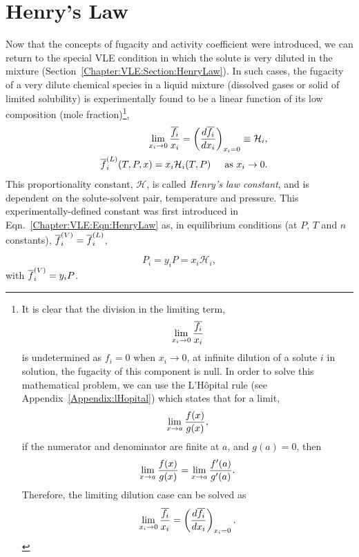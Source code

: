 \section{Henry's Law}\label{Chapter:SolutionThermodynamics:Section:HenryLaw}
Now that the concepts of fugacity and activity coefficient were introduced, we can return to the special VLE condition in which the solute is very diluted in the mixture (Section~\ref{Chapter:VLE:Section:HenryLaw}). In such cases, the fugacity of a very dilute chemical species in a liquid mixture (\eg dissolved gases or solid of limited solubility) is experimentally found to be a linear function of its low composition (\ie mole fraction)\footnote{It is clear that the division in the limiting term,
  \begin{displaymath}
    \lim\limits_{x_{i}\rightarrow 0}\frc{\overline{f_{i}}}{x_{i}}
  \end{displaymath}
  is undetermined as $f_{i}=0\text{ when }x_{i}\rightarrow 0$, \ie at infinite dilution of a solute $i$ in solution, the fugacity of this component is null. In order to solve this mathematical problem, we can use the L'H\^opital rule (see Appendix~\ref{Appendix:lHopital}) which states that for a limit,
         \begin{displaymath}
                 \lim\limits_{x\rightarrow a}\frc{f(x)}{g(x)},
         \end{displaymath}
         if the numerator and denominator are finite at $a$, and $g(a)=0$, then
         \begin{displaymath}
                 \lim\limits_{x\rightarrow a}\frc{f(x)}{g(x)} =  \lim\limits_{x\rightarrow a}\frc{f'(a)}{g'(a)}.
         \end{displaymath}
         Therefore, the limiting dilution case can be solved as
         \begin{displaymath}
                 \lim\limits_{x_{i}\rightarrow 0}\frc{\overline{f_{i}}}{x_{i}} = \left(\frc{d \overline{f_{i}}}{d x_{i}}\right)_{x_{i}=0}.
         \end{displaymath}
}, \ie   
      \begin{eqnarray}
        && \lim\limits_{x_{i}\rightarrow 0}\frc{\overline{f_{i}}}{x_{i}} = \left(\frc{d \overline{f_{i}}}{d x_{i}}\right)_{x_{i}=0}  \equiv \mathcal{H}_{i}, \nonumber \\
        && \mfr[\overline{f}]{i}{L}(T,P,x) = x_{i}\mathcal{H}_{i}(T,P)\;\;\;\;\text{ as } x_{i}\rightarrow 0.
      \end{eqnarray}      
This proportionality constant, $\mathcal{H}$, is called {\it Henry's law constant}, and is dependent on the solute-solvent pair, temperature and pressure. This experimentally-defined constant was first introduced in Eqn.~\ref{Chapter:VLE:Eqn:HenryLaw} as, in equilibrium conditions (at $P$, $T$ and $n$ constants), $\mfr[\overline{f}]{i}{V}=\mfr[\overline{f}]{i}{L}$,
         \begin{shaded}
           \begin{displaymath}
             P_{i} = y_{i}P = x_{i}\mathcal{H}_{i},
           \end{displaymath}
           with $\mfr[\overline{f}]{i}{V}=y_{i}P$.
        \end{shaded}


